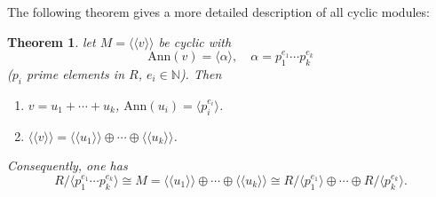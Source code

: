 \documentclass[12pt]{amsbook}
\newtheorem{theorem}{Theorem}[section]
\begin{document}
The following theorem gives a more detailed description of all cyclic modules:
\begin{theorem} \label{thm-crt}
    let $M=\langle\langle v\rangle\rangle$ be cyclic with
    $$\mathrm{Ann}(v)=\langle \alpha\rangle,\quad\alpha = p_1^{e_1}\cdots p_k^{e_k}$$
    ($p_i$ prime elements in $R$, $e_i\in\mathbb{N}$). Then
    \begin{enumerate}
        \item $v = u_1+\cdots+u_k$, $\mathrm{Ann}(u_i)=\langle p_i^{e_i}\rangle$.
        \item $\langle\langle v\rangle\rangle = \langle\langle u_1\rangle\rangle\oplus\cdots\oplus\langle\langle u_k\rangle\rangle$.
    \end{enumerate}
    Consequently, one has
    $$R/\langle p_1^{e_1}\cdots p_k^{e_k}\rangle\cong M=\langle\langle u_1\rangle\rangle\oplus\cdots\oplus\langle\langle u_k\rangle\rangle\cong R/\langle p_1^{e_1}\rangle\oplus\cdots\oplus R/\langle p_k^{e_k}\rangle.$$
\end{theorem}
\end{document}
